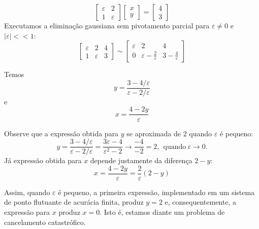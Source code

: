 \begin{ex}
$$\left[\begin{array}{cc}
\varepsilon & 2\\
1 & \varepsilon
\end{array}\right]
\left[\begin{array}{c}x\\y
\end{array}\right]=
\left[\begin{array}{c}4\\3
\end{array}\right]
$$
Executamos a eliminação gaussiana sem pivotamento parcial para $\varepsilon \neq 0$ e $|\varepsilon|<<1$:
$$\left[\begin{array}{cc|c}
\varepsilon & 2 & 4\\
1 & \varepsilon & 3
\end{array}
\right]\sim\left[\begin{array}{cc|c}
\varepsilon & 2 & 4\\
0 & \varepsilon-\frac{2}{\varepsilon} & 3-\frac{4}{\varepsilon}
\end{array}
\right]
$$

Temos
$$y=\frac{3-4/\varepsilon}{\varepsilon-2/\varepsilon}$$%
e
$$x=\frac{4-2y}{\varepsilon}$$ %

Observe que a expressão obtida para  $y$ se aproximada de $2$ quando $\varepsilon$ é pequeno:
$$y=\frac{3-4/\varepsilon}{\varepsilon-2/\varepsilon}=\frac{3\varepsilon-4}{\varepsilon^2-2} \longrightarrow \frac{-4}{-2}=2, ~~\text{quando}~\varepsilon \to 0.$$
Já expressão obtida para $x$ depende justamente da diferença $2-y$:
$$x=\frac{4-2y}{\varepsilon}=\frac{2}{\varepsilon} (2-y)$$

Assim, quando $\varepsilon$ é pequeno, a primeira expressão, implementado em um sistema de ponto flutuante de acurácia finita, produz $y= 2$ e, consequentemente, a expressão para $x$ produz $x=0$. Isto é, estamos diante um problema de cancelamento catastrófico.


\end{ex}
